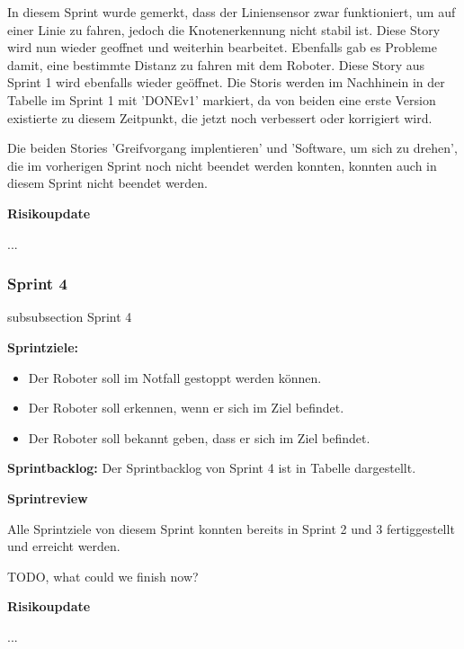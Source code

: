 In diesem Sprint wurde gemerkt, dass der Liniensensor zwar funktioniert, um auf einer Linie zu fahren, jedoch die Knotenerkennung nicht stabil ist. Diese Story wird nun wieder geoffnet und weiterhin bearbeitet. Ebenfalls gab es Probleme damit, eine bestimmte Distanz zu fahren mit dem Roboter. Diese Story aus Sprint 1 wird ebenfalls wieder geöffnet. Die Storis werden im Nachhinein in der Tabelle im Sprint 1 mit 'DONEv1' markiert, da von beiden eine erste Version existierte zu diesem Zeitpunkt, die jetzt noch verbessert oder korrigiert wird.

Die beiden Stories 'Greifvorgang implentieren' und 'Software, um sich zu drehen', die im vorherigen Sprint noch nicht beendet werden konnten, konnten auch in diesem Sprint nicht beendet werden.


\textbf{Risikoupdate}

...


\newpage


\subsubsection*{Sprint 4}
    {subsubsection}
    {Sprint 4}
    
\textbf{Sprintziele:}
\begin{itemize}
    \item Der Roboter soll im Notfall gestoppt werden können.
    \item Der Roboter soll erkennen, wenn er sich im Ziel befindet.
    \item Der Roboter soll bekannt geben, dass er sich im Ziel befindet.
\end{itemize}

\textbf{Sprintbacklog:} Der Sprintbacklog von Sprint 4 ist in Tabelle 
dargestellt.



\textbf{Sprintreview}

Alle Sprintziele von diesem Sprint konnten bereits in Sprint 2 und 3 fertiggestellt und erreicht werden.

TODO, what could we finish now?

\textbf{Risikoupdate}

...

